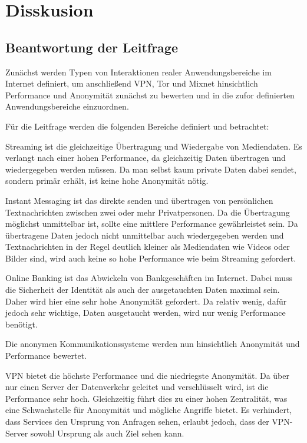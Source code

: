\section{Disskusion}

\subsection{Beantwortung der Leitfrage}

Zunächst werden Typen von Interaktionen realer Anwendungsbereiche im Internet definiert, um anschließend VPN, Tor und Mixnet hinsichtlich Performance und Anonymität zunächst zu bewerten und in die zufor definierten Anwendungsbereiche einzuordnen.

Für die Leitfrage werden die folgenden Bereiche definiert und betrachtet:

Streaming ist die gleichzeitige Übertragung und Wiedergabe von Mediendaten. Es verlangt nach einer hohen Performance, da gleichzeitig Daten übertragen und wiedergegeben werden müssen. Da man selbst kaum private Daten dabei sendet, sondern primär erhält, ist keine hohe Anonymität nötig.

Instant Messaging ist das direkte senden und übertragen von persönlichen Textnachrichten zwischen zwei oder mehr Privatpersonen. Da die Übertragung möglichst unmittelbar ist, sollte eine mittlere Performance gewährleistet sein. Da übertragene Daten jedoch nicht unmittelbar auch wiedergegeben werden und Textnachrichten in der Regel deutlich kleiner als Mediendaten wie Videos oder Bilder sind, wird auch keine so hohe Performance wie beim Streaming gefordert.

Online Banking ist das Abwickeln von Bankgeschäften im Internet. Dabei muss die Sicherheit der Identität als auch der ausgetauchten Daten maximal sein. Daher wird hier eine sehr hohe Anonymität gefordert. Da relativ wenig, dafür jedoch sehr wichtige, Daten ausgetaucht werden, wird nur wenig Performance benötigt.

Die anonymen Kommunikationssysteme werden nun hinsichtlich Anonymität und Performance bewertet.

VPN bietet die höchste Performance und die niedriegste Anonymität. Da über nur einen Server der Datenverkehr geleitet und verschlüsselt wird, ist die Performance sehr hoch. Gleichzeitig führt dies zu einer hohen Zentralität, was eine Schwachstelle für Anonymität und mögliche Angriffe bietet. Es verhindert, dass Services den Ursprung von Anfragen sehen, erlaubt jedoch, dass der VPN-Server sowohl Ursprung als auch Ziel sehen kann.

